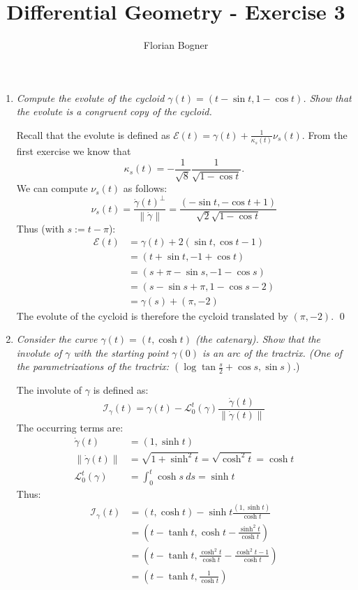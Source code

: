 \documentclass[a4paper,11pt,notitlepage,fullpage]{article}
\begin{document}
\author{Florian Bogner}
\title{Differential Geometry - Exercise 3}
\maketitle

\begin{enumerate}

\item \emph{Compute the evolute of the cycloid $\gamma(t) = (t-\sin t, 1-\cos t)$. Show that the evolute is a congruent copy of the cycloid.}

Recall that the evolute is defined as $\mathcal E(t) = \gamma(t) + \frac{1}{\kappa_s(t)}\nu_s(t)$. From the first exercise we know that 
\begin{equation*}
\kappa_s(t) = - \frac{1}{\sqrt{8}} \frac{1}{\sqrt{1 - \cos t}}. 
\end{equation*}
We can compute $\nu_s(t)$ as follows:
\begin{equation*}
\nu_s(t) = \frac{\dot\gamma(t)^\perp}{\left\|\dot\gamma\right\|} = \frac{(-\sin t, -\cos t + 1)}{\sqrt{2}\sqrt{1-\cos t}}
\end{equation*}
Thus (with $s:= t - \pi$):
\begin{align*}
\mathcal E(t) &= \gamma(t) + 2 (\sin t, \cos t - 1) \\
&= (t + \sin t, - 1 + \cos t) \\
&= (s + \pi - \sin s, - 1 - \cos s) \\
&= (s - \sin s + \pi, 1 - \cos s - 2) \\
&= \gamma(s) + (\pi, -2)
\end{align*}
The evolute of the cycloid is therefore the cycloid translated by $(\pi, -2)$. \qed


\item \emph{Consider the curve $\gamma(t) = (t, \cosh t)$ (the \emph{catenary}). Show that the involute of $\gamma$ with the starting point $\gamma(0)$ is an arc of the tractrix. (One of the parametrizations of the tractrix: $(\log\tan\frac{s}{2} + \cos s, \sin s)$}.)

The involute of $\gamma$ is defined as:
\begin{equation*}
\mathcal I_{\gamma}(t) = \gamma(t) - \mathcal L_0^t(\gamma)\frac{\dot\gamma(t)}{\|\dot\gamma(t)\|}
\end{equation*}
The occurring terms are:
\begin{align*}
\dot\gamma(t) &= (1, \sinh t) \\
\|\dot\gamma(t)\| &= \sqrt{1 + \sinh^2 t} = \sqrt{\cosh^2 t} = \cosh t \\
\mathcal L_0^t(\gamma) &= \int_0^t \cosh s ~ds = \sinh t
\end{align*}
Thus:
\begin{align*}
\mathcal I_{\gamma}(t) &= (t, \cosh t) - \sinh t \frac{(1, \sinh t)}{\cosh t} \\
&= \left(t - \tanh t, \cosh t - \frac{\sinh^2 t}{\cosh t}\right) \\
&= \left(t - \tanh t, \frac{\cosh^2 t}{\cosh t} - \frac{\cosh^2 t - 1}{\cosh t}\right) \\
&= \left(t - \tanh t, \frac{1}{\cosh t}\right)
\end{align*}


\end{enumerate}
\end{document}

